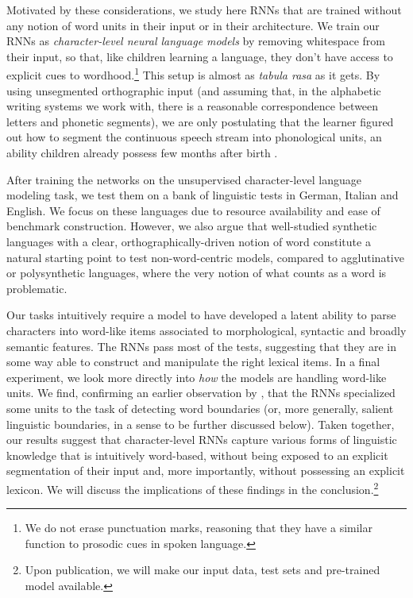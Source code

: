 Motivated by these considerations, we study here RNNs that are trained
without any notion of word units in their input or in their
architecture. We train our RNNs as \emph{character-level neural
  language models}
\cite[CNLMs,][]{Mikolov:etal:2011,Sutskever:etal:2011,DBLP:journals/corr/Graves13}
by removing whitespace from their input, so that, like children
learning a language, they don't have access to explicit cues to
wordhood.\footnote{We do not erase punctuation marks, reasoning that
  they have a similar function to prosodic cues in spoken language.}
This setup is almost as \emph{tabula rasa} as it gets. By using
unsegmented orthographic input (and assuming that, in the alphabetic
writing systems we work with, there is a reasonable correspondence
between letters and phonetic segments), we are only postulating that
the learner figured out how to segment the continuous speech stream
into phonological units, an ability children already possess few
months after birth \cite[e.g.,][]{Maye:etal:2002,Kuhl:2004}.

After training the networks on the unsupervised character-level
language modeling task, we test them on a bank of linguistic tests in
German, Italian and English. We focus on these languages due to
resource availability and ease of benchmark construction. However, we
also argue that well-studied synthetic languages with a clear,
orthographically-driven notion of word constitute a natural starting
point to test non-word-centric models, compared to agglutinative or
polysynthetic languages, where the very notion of what counts as a
word is problematic. %
  
Our tasks intuitively require a model to have developed a latent
ability to parse characters into word-like items associated to
morphological, syntactic and broadly semantic features. The RNNs
pass most of the tests, suggesting that they are in some way able to
construct and manipulate the right lexical items. In a final experiment,
we look more directly into \emph{how} the models are handling
word-like units. We find, confirming an earlier observation by
, that the RNNs specialized some
units to the task of detecting word boundaries (or, more generally,
salient linguistic boundaries, in a sense to be further discussed
below). Taken together, our results suggest that character-level RNNs
capture various forms of linguistic knowledge that is intuitively
word-based, without being exposed to an explicit segmentation of their
 input and, more importantly, without possessing an explicit
lexicon. We will discuss the implications of these findings in the
conclusion.\footnote{Upon publication, we will make our input data,
  test sets and pre-trained model available.}

